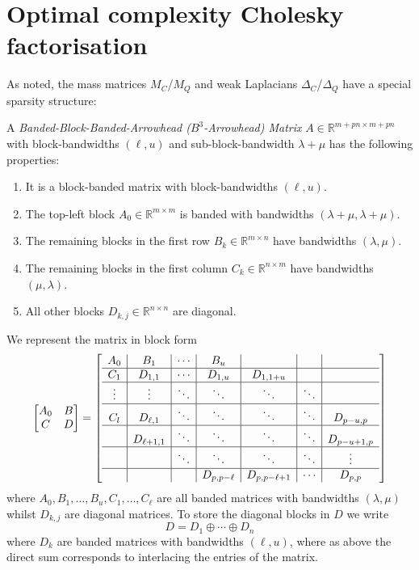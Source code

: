 \documentclass[hidelinks,onefignum,onetabnum]{siamart220329}
\def\bbR{{\mathbb R}}
\begin{document}
 

\section{Optimal complexity Cholesky factorisation}\label{Section:Cholesky}


As noted, the  mass matrices  $M_C$/$M_Q$ and weak Laplacians $\Delta_C$/$\Delta_Q$ have a special sparsity structure:

\begin{definition}
A {\it Banded-Block-Banded-Arrowhead  ($B^3$-Arrowhead) Matrix} $A \in \bbR^{m+pn \times m+pn}$  with block-bandwidths $(\ell,u)$ and sub-block-bandwidth $\lambda+\mu$  has the following properties:
\begin{enumerate}
\item It is a block-banded matrix with block-bandwidths $(\ell,u)$.
\item The top-left block $A_0 \in \bbR^{m \times m}$ is banded with bandwidths $(\lambda+\mu,\lambda+\mu)$.
\item The remaining blocks in the first row  $B_k \in \bbR^{m \times n}$ have bandwidths $(\lambda,\mu)$.
\item The remaining blocks in the first column  $C_k \in \bbR^{n \times m}$ have bandwidths $(\mu,\lambda)$.
\item All other blocks $D_{k,j} \in \bbR^{n \times n}$ are diagonal.
\end{enumerate}
We represent the matrix in block form
\begin{align}
\begin{bmatrix}
A_0 & B \\
C & D
\end{bmatrix} = \left[\begin{array}{c|c|c|c|c|c|c}
A_0 & B_1 & \cdots & B_u & &  \\
\hline
C_1 & D_{1,1} & \cdots & D_{1,u}  & D_{1,1+u} &  \\
\hline
\vdots & \vdots & \ddots & \ddots & \ddots  & \ddots \\
\hline
C_l & D_{\ell,1} & \ddots & \ddots & \ddots & \ddots & D_{p-u,p}  \\
\hline
& D_{\ell+1,1} & \ddots & \ddots & \ddots & \ddots & D_{p-u+1,p} \\
\hline 
&& \ddots & \ddots & \ddots & \ddots & \vdots \\
\hline
&&& D_{p,p-\ell} & D_{p,p-\ell+1} & \cdots & D_{p,p}
\end{array}\right]
\label{eq:A}
\end{align}
where $A_0,B_1,\ldots,B_u,C_1,\ldots,C_\ell$ are all banded matrices with bandwidths $(\lambda,\mu)$ whilst $D_{k,j}$ are diagonal matrices. To store the diagonal blocks in $D$  we write
\[
	D = D_1 \oplus \cdots \oplus D_n
\]
where $D_k$ are banded matrices with bandwidths $(\ell,u)$, where  as above the direct sum corresponds to interlacing the entries of the matrix.
\end{definition}
\end{document}
